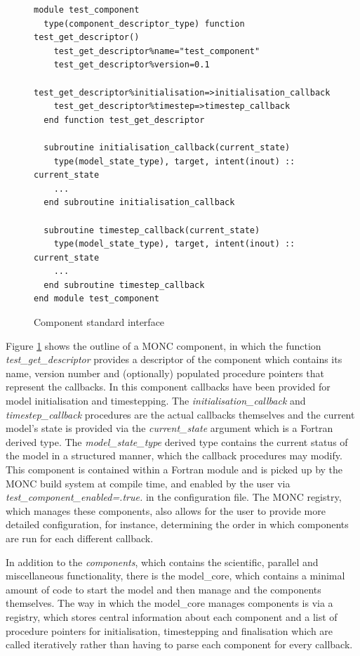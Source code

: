 \documentclass[a4paper,11pt]{article}
\begin{document}
\begin{figure}
\centering
\begin{verbatim}
module test_component
  type(component_descriptor_type) function test_get_descriptor()
    test_get_descriptor%name="test_component"
    test_get_descriptor%version=0.1
    test_get_descriptor%initialisation=>initialisation_callback
    test_get_descriptor%timestep=>timestep_callback
  end function test_get_descriptor

  subroutine initialisation_callback(current_state)
    type(model_state_type), target, intent(inout) :: current_state
    ...
  end subroutine initialisation_callback

  subroutine timestep_callback(current_state)
    type(model_state_type), target, intent(inout) :: current_state
    ...
  end subroutine timestep_callback
end module test_component
\end{verbatim}
\caption{Component standard interface}
\label{fig:component}
\end{figure}

Figure \ref{fig:component} shows the outline of a MONC component, in which the
function \emph{test\_get\_descriptor} provides a descriptor of the component
which contains its name, version number and (optionally) populated procedure
pointers that represent the callbacks. In this component
callbacks have been provided for model initialisation and timestepping.
The \emph{initialisation\_callback} and \emph{timestep\_callback} procedures
are the actual callbacks themselves and the current model's state is provided
via the \emph{current\_state} argument which is a Fortran derived type.
The \emph{model\_state\_type} derived type contains the current status of the
model in a structured manner, which the callback procedures may modify. This
component is contained within a Fortran module and is picked up by the MONC
build system at compile time, and enabled by the user via
\emph{test\_component\_enabled=.true.} in the configuration file. The MONC
registry, which manages these components, also allows for the user to provide
more detailed configuration, for instance, determining the order in which
components are run for each different callback.

In addition to the \emph{components}, which contains the scientific, parallel and
miscellaneous functionality, there is the model\_core, which
contains a minimal amount of code to start the model and then manage and the
components themselves. The way in which the model\_core manages components
is via a registry, which stores central information about each component and a
list of procedure pointers for initialisation, timestepping and finalisation
which are called iteratively rather than having to parse each component for
every callback.
\end{document}
